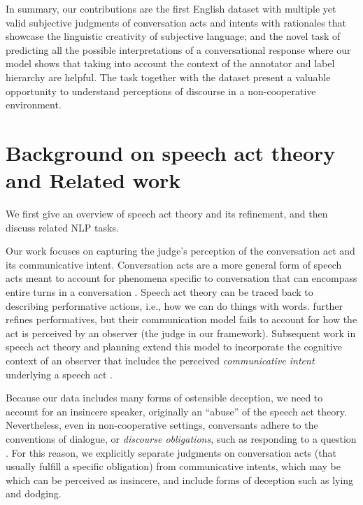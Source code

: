 In summary, our contributions are the first English dataset with multiple yet valid subjective judgments of conversation acts and intents with rationales that showcase the linguistic creativity of subjective language; and the novel task of predicting all the possible interpretations of a conversational response where our model shows that taking into account the context of the annotator and label hierarchy are helpful. The task together with the dataset present a valuable opportunity to understand perceptions of discourse in a non-cooperative environment.

\section{Background on speech act theory and Related work}
We first give an overview of speech act theory and its refinement, and then discuss related NLP tasks.

Our work focuses on capturing the judge's perception of the conversation act and its communicative intent. Conversation acts are a more general form of speech acts meant to account for phenomena specific to conversation that can encompass entire turns in a conversation \cite{Traum:1992}. Speech act theory can be traced back to  describing performative actions, i.e., how we can do things with words.  further refines performatives, but 
their communication model fails to account for how the act is perceived by an observer (the judge in our framework). Subsequent work in speech act theory and planning extend this model to incorporate the cognitive context of an observer that includes the perceived \emph{communicative intent} underlying a speech act \cite{Cohen:1979,Pollack:1986}.

Because our data includes many forms of ostensible deception, we need to account for an insincere speaker, originally an ``abuse'' of the speech act theory. Nevertheless, even in non-cooperative settings, conversants adhere to the conventions of dialogue, or \emph{discourse obligations}, such as responding to a question \cite{Traum:1994,Potts:2008}. For this reason, we explicitly separate judgments on conversation acts (that usually fulfill a specific obligation) from communicative intents, which
may be which can be perceived as insincere, and include forms of deception such as lying and dodging.  

